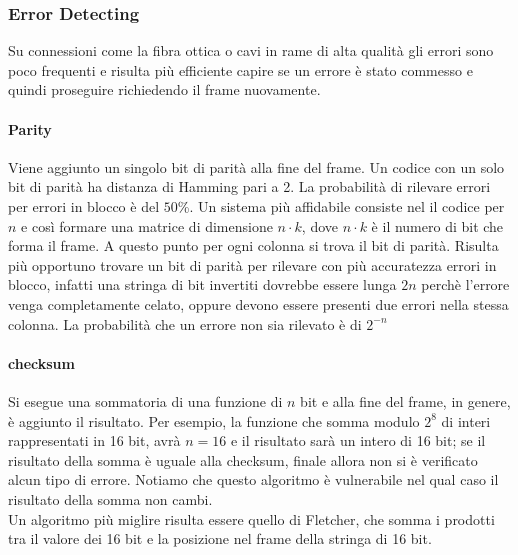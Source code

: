 \documentclass{article}
\begin{document}
\subsubsection{Error Detecting}
Su connessioni come la fibra ottica o cavi in rame di alta qualità gli errori
sono poco frequenti e risulta più efficiente capire se un errore è stato
commesso e quindi proseguire richiedendo il frame nuovamente.

\paragraph{Parity} Viene aggiunto un singolo bit di parità alla fine del frame.
Un codice con un solo bit di parità ha distanza di Hamming pari a 2. La
probabilità di rilevare errori per errori in blocco è del $50$\%. Un sistema più
affidabile consiste nel il codice per $n$ e così formare una matrice di
dimensione $n \cdot k$, dove $n \cdot k$ è il numero di bit che forma il frame.
A questo punto per ogni colonna si trova il bit di parità. Risulta più opportuno
trovare un bit di parità per rilevare con più accuratezza errori in blocco,
infatti una stringa di bit invertiti dovrebbe essere lunga $2n$ perchè l'errore
venga completamente celato, oppure devono essere presenti due errori nella
stessa colonna. La probabilità che un errore non sia rilevato è di $2^{-n}$

\paragraph{checksum}
Si esegue una sommatoria di una funzione di $n$ bit e alla fine del frame, in
genere, è aggiunto il risultato. Per esempio, la funzione che somma modulo
$2^8$ di interi rappresentati in 16 bit, avrà $n = 16$ e il risultato sarà un
intero di 16 bit; se il risultato della somma è uguale alla checksum, finale
allora non si è verificato alcun tipo di errore. Notiamo che questo algoritmo è
vulnerabile nel qual caso il risultato della somma non cambi.\\
Un algoritmo più miglire risulta essere quello di Fletcher, che somma i prodotti
tra il valore dei 16 bit e la posizione nel frame della stringa di 16 bit.
\end{document}
